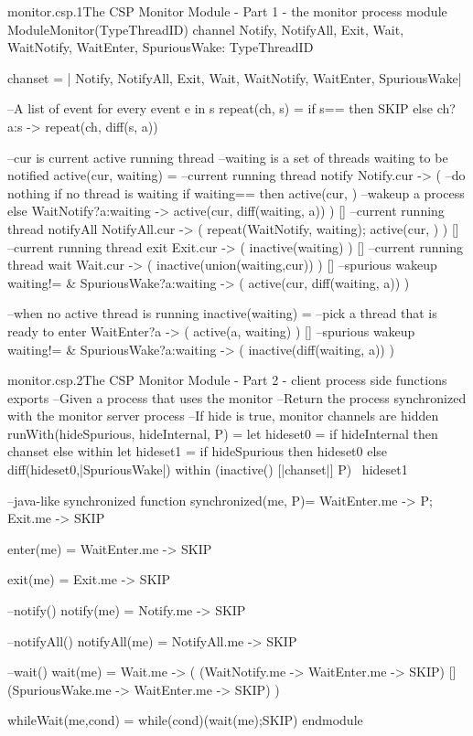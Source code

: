 \documentclass[a4paper, 12pt]{article}
\begin{document}
\begin{cspfloat}{monitor.csp.1}{The CSP Monitor Module - Part 1 - the monitor process}
module ModuleMonitor(TypeThreadID)
  channel Notify, NotifyAll, Exit, Wait, 
          WaitNotify, WaitEnter, SpuriousWake: TypeThreadID

  chanset = {| Notify, NotifyAll, Exit, Wait, WaitNotify, WaitEnter, SpuriousWake|}

  --A list of event for every event e in s
  repeat(ch, s) = if s=={} then SKIP else ch?a:s -> repeat(ch, diff(s, {a}))

  --cur is current active running thread
  --waiting is a set of threads waiting to be notified
  active(cur, waiting) =
    --current running thread notify
    Notify.cur -> (
      --do nothing if no thread is waiting
      if waiting=={} then active(cur, {})
      --wakeup a process
      else WaitNotify?a:waiting -> 
           active(cur, diff(waiting, {a}))
    ) [] --current running thread notifyAll
    NotifyAll.cur -> (
      repeat(WaitNotify, waiting);
      active(cur, {})
    ) [] --current running thread exit
    Exit.cur -> (
      inactive(waiting)
    ) [] --current running thread wait
    Wait.cur -> (
      inactive(union(waiting,{cur}))
    ) [] --spurious wakeup
    waiting!={} & SpuriousWake?a:waiting -> (
      active(cur, diff(waiting, {a}))
    )

  --when no active thread is running
  inactive(waiting) = 
    --pick a thread that is ready to enter
    WaitEnter?a -> (
      active(a, waiting)
    ) []
    --spurious wakeup
    waiting!={} & SpuriousWake?a:waiting -> (
      inactive(diff(waiting, {a}))
    )
\end{cspfloat}

\begin{cspfloat}{monitor.csp.2}{The CSP Monitor Module - Part 2 - client process side functions}
exports
  --Given a process that uses the monitor
  --Return the process synchronized with the monitor server process
  --If hide is true, monitor channels are hidden
  runWith(hideSpurious, hideInternal, P) = 
    let hideset0 = if hideInternal then chanset else {} within
    let hideset1 = if hideSpurious then hideset0 
                   else diff(hideset0,{|SpuriousWake|}) within
    (inactive({}) [|chanset|] P) \ hideset1
  
  --java-like synchronized function
  synchronized(me, P)= WaitEnter.me -> P; Exit.me -> SKIP

  enter(me) = WaitEnter.me -> SKIP

  exit(me) = Exit.me -> SKIP

  --notify()
  notify(me) = Notify.me -> SKIP

  --notifyAll()
  notifyAll(me) = NotifyAll.me -> SKIP

  --wait()
  wait(me) =
    Wait.me -> (
      (WaitNotify.me -> WaitEnter.me -> SKIP)
    [](SpuriousWake.me -> WaitEnter.me -> SKIP)
    )
  
  whileWait(me,cond) = while(cond)(wait(me);SKIP)
endmodule
\end{cspfloat}
\end{document}
